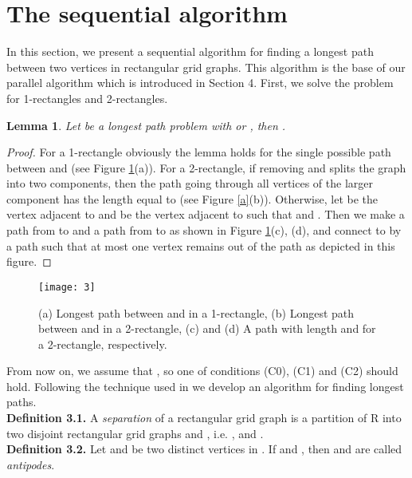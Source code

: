 \documentclass[preprint,12pt]{elsarticle}
\newtheorem{lem}{Lemma}[section]
\begin{document}
\section{\bf The sequential algorithm}
In this section, we present a sequential algorithm for finding a
longest path between two vertices in rectangular grid graphs. This
algorithm is the base of our parallel algorithm which is introduced
in Section 4. First, we solve the problem for 1-rectangles and
2-rectangles.
\begin{lem} \label{Lemma:5} \cite{FAA:ALAFFLPIRGG} Let  be a longest
path problem with  or , then
.
\end{lem}
\begin{proof}
For a 1-rectangle obviously the lemma holds for the single possible
path between  and  (see Figure \ref{a3}(a)). For a
2-rectangle, if removing  and  splits the graph into two
components, then the path going through all vertices of the larger
component has the length equal to  (see Figure
\ref{a}(b)). Otherwise, let  be the vertex adjacent to 
and  be the vertex adjacent to  such that   and . Then we make a path from  to
 and a path from  to  as shown in Figure
\ref{a3}(c), (d), and connect  to  by a path such that
at most one vertex remains out of the path as depicted in this
figure.
\end{proof}
\begin{figure}[tb]
  \centering
  \texttt{[image: 3]}
  \caption[]{
 (a) Longest path between  and  in a 1-rectangle,
  (b) Longest path between  and  in a 2-rectangle,
  (c) and (d) A path with length  and  for a 2-rectangle, respectively.}
  \label{a3}
\end{figure}
From now on, we assume that , so one of conditions (C0),
(C1) and (C2) should hold. Following the technique used in
\cite{CST:AFAFCHPIM} we develop an algorithm for finding longest
paths.\\

\noindent\textbf{Definition 3.1.} \cite{FAA:ALAFFLPIRGG} A
\textit{separation} of a rectangular grid graph  is a partition
of R into two disjoint rectangular grid graphs  and , i.e.
, and .\\

\noindent\textbf{Definition 3.2.} \cite{IPS:HPIGG} Let 
and  be two distinct vertices in . If
 and , then  and
 are called \textit{antipodes}.
\\
\end{document}
